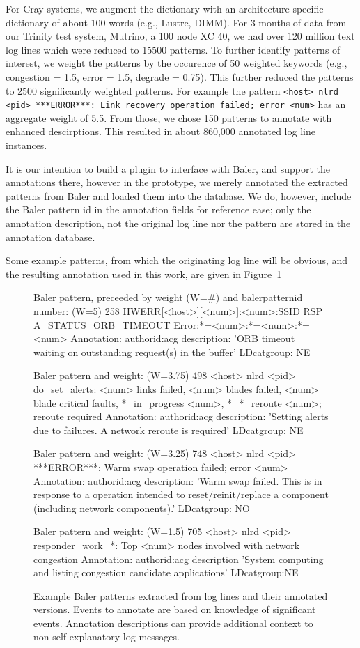 For Cray systems, we augment
the dictionary with an architecture specific dictionary of about 100 words (e.g., Lustre, DIMM).
For 3 months of data from our Trinity test system, Mutrino, a 100 node XC 40,
we had over 120 million text log lines which were reduced to 15500 patterns. To further identify patterns
of interest, we weight the patterns by the occurence of 50 weighted
keywords (e.g., congestion = 1.5, error = 1.5, degrade = 0.75). This further reduced the patterns
to 2500 significantly weighted patterns. For example the pattern
\texttt{<host> nlrd <pid> ***ERROR***: Link recovery operation failed; error <num>} has
an aggregate weight of 5.5. From those, we chose 150
patterns to annotate with enhanced descirptions. This resulted in about 860,000
annotated log line instances.

It is our intention to
build a plugin to interface with Baler, and support the annotations there,
however in the prototype, we merely annotated the extracted patterns from
Baler and loaded them into the database.
We do, however, include the Baler pattern id in the annotation fields
for reference ease; only the annotation description, not the original log line nor the pattern
are stored in the annotation database.

Some example patterns, from which the originating log line will be obvious, and
the resulting annotation used in this work, are given in Figure~\ref{f:baler}

\begin{figure}
\begin{annol}

Baler pattern, preceeded by weight (W=#) and balerpatternid number:
(W=5)        258   HWERR[<host>][<num>]:<num>:SSID RSP A_STATUS_ORB_TIMEOUT Error:*=<num>:*=<num>:*=<num>
Annotation:
authorid:acg  description: 'ORB timeout waiting on outstanding request(s) in the buffer'  LDcatgroup: NE

Baler pattern and weight:
(W=3.75)     498   <host> nlrd <pid> do_set_alerts: <num> links failed, <num> blades failed, <num> blade critical faults, *_in_progress <num>, *_*_reroute <num>; reroute required
Annotation:
authorid:acg  description: 'Setting alerts due to failures. A network reroute is required' LDcatgroup: NE

Baler pattern and weight:
(W=3.25)     748   <host> nlrd <pid> ***ERROR***: Warm swap operation failed; error <num>
Annotation:
authorid:acg description: 'Warm swap failed. This is in response to a operation intended to reset/reinit/replace a component (including network components).' LDcatgroup: NO

Baler pattern and weight:
(W=1.5)      705   <host> nlrd <pid> responder_work_*: Top <num> nodes involved with network congestion
Annotation:
authorid:acg description 'System computing and listing congestion candidate applications' LDcatgroup:NE
\end{annol}
\caption{Example Baler patterns extracted from log lines and their annotated versions. Events to annotate are based on
knowledge of significant events. Annotation descriptions can provide additional context to non-self-explanatory log messages.}
\label{f:baler}
\end{figure}

